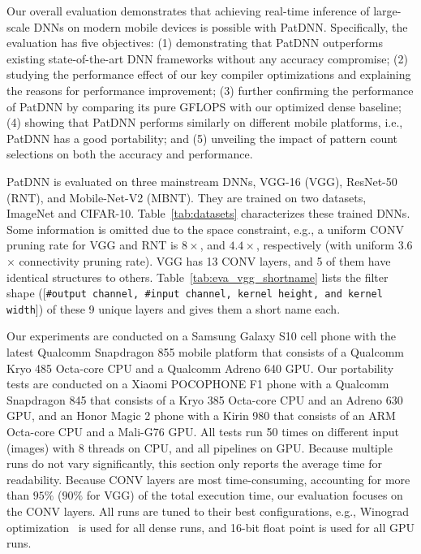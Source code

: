 \documentclass[sigplan,screen]{acmart}
\begin{document}
 Our overall evaluation 
demonstrates that achieving real-time inference of large-scale DNNs on modern mobile devices is possible with PatDNN. Specifically, the evaluation has five objectives: 
(1) demonstrating that PatDNN outperforms existing state-of-the-art DNN frameworks 
without any accuracy compromise; 
(2) studying the performance effect of our key compiler optimizations 
and explaining the reasons for performance improvement; 
(3) further confirming the performance of PatDNN by comparing its pure GFLOPS with our optimized dense baseline; 
(4) showing that PatDNN performs similarly on different mobile platforms, i.e., PatDNN has a good portability; and 
(5) unveiling the impact of pattern count selections on both the accuracy and performance.       

 PatDNN is evaluated on three mainstream DNNs, VGG-16 (VGG), ResNet-50 (RNT), and Mobile-Net-V2 (MBNT). They are trained on two datasets, ImageNet and CIFAR-10. Table~\ref{tab:datasets} characterizes these trained DNNs.
Some information is omitted due to the space constraint, e.g., a uniform CONV pruning rate for VGG and RNT is $8\times$, and $4.4\times$, respectively (with uniform 3.6$\times$ connectivity pruning rate).
VGG has 13 CONV layers, and 5 of them have identical structures to others. Table~\ref{tab:eva_vgg_shortname} lists the filter shape ([{\tt \#output channel, \#input channel, kernel height, and kernel width}]) of these 9 unique layers and gives them a short name each.

 Our experiments are conducted on a Samsung Galaxy S10 cell phone with the latest Qualcomm Snapdragon 855 mobile platform that consists of a Qualcomm Kryo 485 Octa-core CPU and a Qualcomm Adreno 640 GPU. 
Our portability tests are conducted on a Xiaomi POCOPHONE F1 phone with a Qualcomm Snapdragon 845 that consists of a Kryo 385 Octa-core CPU and an Adreno 630 GPU, and an Honor Magic 2 phone with a Kirin 980 that consists of an ARM Octa-core CPU and a Mali-G76 GPU.
All tests run 50 times on different input (images) with 8 threads on CPU, and all pipelines on GPU. Because multiple runs do not vary significantly, this section only reports the average time for readability. Because CONV layers are most time-consuming, accounting for more than 
$95\%$ ($90\%$ for VGG)
of the total execution time, our evaluation focuses on the CONV layers. 
All runs are tuned to their best configurations, e.g., Winograd optimization~\cite{lavin2016fast} is used for all dense runs, and 16-bit float point is used for all GPU runs.
\end{document}
